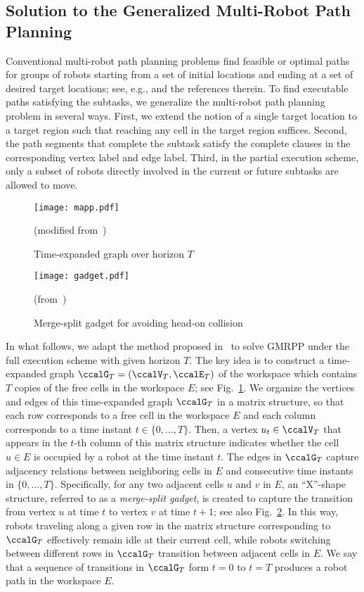\documentclass[Afour,sageh,times]{sagej}
\begin{document}
{{\subsection{Solution to the Generalized Multi-Robot Path Planning}\label{sec:solution2mapp}

{ Conventional multi-robot path planning problems  find feasible or optimal paths for groups of robots starting from a set of initial locations and ending at a set of desired target locations; see, e.g., \cite{yu2016optimal} and the references therein. To find executable paths satisfying the subtasks, we generalize the multi-robot path planning problem in several ways. First,  we extend the notion of a single target location to a target region such that reaching any cell in the target region suffices. Second, the path segments that complete the  subtask  satisfy the complete clauses in the corresponding vertex label and edge label. Third, in the partial execution scheme,  only a subset of robots  directly involved in the current or future subtasks are allowed to move.
\begin{figure}[t]
  \centering
  \texttt{[image: mapp.pdf]}
  \caption{Time-expanded graph over horizon $T$} (modified from~\cite{yu2016optimal})
  \label{fig:mapp}
\end{figure}

\begin{figure}[t]
  \centering
  \texttt{[image: gadget.pdf]}
  \caption{Merge-split gadget for avoiding head-on collision} (from~\cite{yu2016optimal})
  \label{fig:gadget}
\end{figure}

  In what follows, we adapt the method proposed in~\cite{yu2016optimal} to solve GMRPP under the full execution scheme with given horizon $T$.  The key idea is to construct a time-expanded graph $\ccalG_T = (\ccalV_T, \ccalE_T)$ of the workspace which contains $T$ copies of the free cells in the workspace $E$; see Fig.~\ref{fig:mapp}. We organize the vertices and edges of this time-expanded graph $\ccalG_T$ in a matrix structure, so that each row corresponds to a free cell in the workspace $E$ and each column corresponds to a time instant $t\in \{0,\ldots,T\}$. Then, a vertex $u_t \in \ccalV_T$ that appears in the $t$-th column of this matrix structure indicates whether the cell $u\in E$ is occupied by a robot at the time instant $t$. The edges in $\ccalG_T$ capture  adjacency relations between neighboring cells in $E$ and consecutive time instants in $\{0,\ldots,T\}$. Specifically, for any two adjacent cells $u$ and $v$ in $E$, an ``X''-shape structure, referred to as a {\it merge-split gadget}, is created to capture the transition from vertex $u$ at time $t$ to vertex $v$ at time $t+1$; see also Fig.~\ref{fig:gadget}. In this way, robots traveling along a given row in the matrix structure corresponding to $\ccalG_T$ effectively remain idle at their current cell, while robots switching between different rows in $\ccalG_T$ transition between adjacent cells in $E$. We say that a sequence of transitions in $\ccalG_T$ form $t=0$ to $t=T$ produces a robot path in the workspace $E$.

}}}
\end{document}
